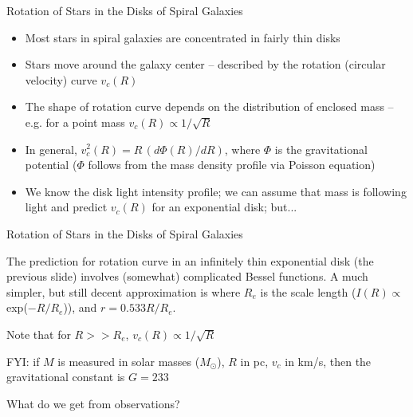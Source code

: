 \documentclass[letterpaper,landscape]{slides}
\begin{document}

\begin{slide}
\begin{center}
{\large \color{red} 
             Rotation of Stars in the Disks of Spiral Galaxies }
\end{center}

\begin{itemize}
\item Most stars in spiral galaxies are concentrated in fairly thin disks
\item Stars move around the galaxy center -- described by the rotation (circular
     velocity) curve $v_c(R)$
\item The shape of rotation curve depends on the distribution of enclosed
      mass -- e.g. for a point mass $v_c(R) \propto 1/\sqrt{R}$
\item In general, $v^2_c(R) = R \, (d\Phi(R)/dR)$, where $\Phi$ is the gravitational
      potential ($\Phi$ follows from the mass density profile via Poisson 
      equation)
\item We know the disk light intensity profile; we can assume that mass is 
      following light and predict $v_c(R)$ for an exponential disk; but...
\end{itemize}     
 
\vfill
\end{slide}





\begin{slide}
\begin{center}
{\large \color{red} 
             Rotation of Stars in the Disks of Spiral Galaxies }
\end{center}


The prediction for rotation curve in an infinitely thin 
exponential disk (the previous slide) involves (somewhat)
complicated Bessel functions. A much simpler, but still
decent approximation is 
where $R_e$ is the scale length ($I(R) \propto$ exp($-R/R_e$)), and
$r = 0.533 R/R_e$. 

Note that for $R >> R_e$, $v_c(R) \propto 1/\sqrt{R}$

FYI: if $M$ is measured in solar masses ($M_\odot$), $R$ in pc, 
$v_c$ in km/s, then the gravitational constant is $G=233$

{\color{blue} What do we get from observations?}

\vfill
\end{slide}
\end{document}

